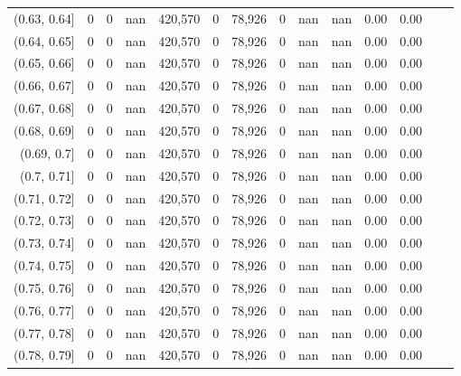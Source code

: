 \begin{tabular}{rrrrrrrrrrrrrr}
(0.63, 0.64]   &        0 &       0 &    nan &  420,570 &        0 &  78,926 &       0 &   nan &   nan &  0.00 &      0.00 \\
(0.64, 0.65]   &        0 &       0 &    nan &  420,570 &        0 &  78,926 &       0 &   nan &   nan &  0.00 &      0.00 \\
(0.65, 0.66]   &        0 &       0 &    nan &  420,570 &        0 &  78,926 &       0 &   nan &   nan &  0.00 &      0.00 \\
(0.66, 0.67]   &        0 &       0 &    nan &  420,570 &        0 &  78,926 &       0 &   nan &   nan &  0.00 &      0.00 \\
(0.67, 0.68]   &        0 &       0 &    nan &  420,570 &        0 &  78,926 &       0 &   nan &   nan &  0.00 &      0.00 \\
(0.68, 0.69]   &        0 &       0 &    nan &  420,570 &        0 &  78,926 &       0 &   nan &   nan &  0.00 &      0.00 \\
(0.69, 0.7]    &        0 &       0 &    nan &  420,570 &        0 &  78,926 &       0 &   nan &   nan &  0.00 &      0.00 \\
(0.7, 0.71]    &        0 &       0 &    nan &  420,570 &        0 &  78,926 &       0 &   nan &   nan &  0.00 &      0.00 \\
(0.71, 0.72]   &        0 &       0 &    nan &  420,570 &        0 &  78,926 &       0 &   nan &   nan &  0.00 &      0.00 \\
(0.72, 0.73]   &        0 &       0 &    nan &  420,570 &        0 &  78,926 &       0 &   nan &   nan &  0.00 &      0.00 \\
(0.73, 0.74]   &        0 &       0 &    nan &  420,570 &        0 &  78,926 &       0 &   nan &   nan &  0.00 &      0.00 \\
(0.74, 0.75]   &        0 &       0 &    nan &  420,570 &        0 &  78,926 &       0 &   nan &   nan &  0.00 &      0.00 \\
(0.75, 0.76]   &        0 &       0 &    nan &  420,570 &        0 &  78,926 &       0 &   nan &   nan &  0.00 &      0.00 \\
(0.76, 0.77]   &        0 &       0 &    nan &  420,570 &        0 &  78,926 &       0 &   nan &   nan &  0.00 &      0.00 \\
(0.77, 0.78]   &        0 &       0 &    nan &  420,570 &        0 &  78,926 &       0 &   nan &   nan &  0.00 &      0.00 \\
(0.78, 0.79]   &        0 &       0 &    nan &  420,570 &        0 &  78,926 &       0 &   nan &   nan &  0.00 &      0.00 \\

\end{tabular}
